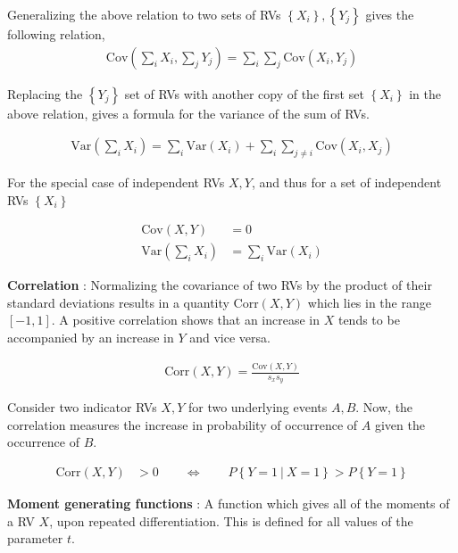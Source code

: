Generalizing the above relation to two sets of RVs $ \left\{X_i\right\}, \left\{Y_j\right\} $ gives the following relation, 
\begin{align}
	\mathrm{Cov} \left( \sum\limits_{i}X_i , \sum\limits_{j}Y_j \right) = \sum\limits_{i} \sum\limits_{j} \mathrm{Cov} (X_i, Y_j)
\end{align}

Replacing the $ \left\{Y_j\right\} $ set of RVs with another copy of the first set $  \left\{X_i\right\} $ in the above relation, gives a formula for the variance of the sum of RVs.

\begin{align}
	\mathrm{Var} \left( \sum\limits_{i}X_i \right) = \sum\limits_{i} \mathrm{Var}(X_i) + \sum\limits_{i} \sum\limits_{j \neq i} \mathrm{Cov} (X_i, X_j)
\end{align}

For the special case of independent RVs $ X, Y $, and thus for a set of independent RVs $ \left\{X_i\right\} $

\begin{align}
	\mathrm{Cov}(X, Y) &= 0 \\
	\mathrm{Var} \left( \sum\limits_{i}X_i \right) &= \sum\limits_{i}\mathrm{Var}(X_i) 
\end{align}

\textbf{Correlation} : Normalizing the covariance of two RVs by the product of their standard deviations results in a quantity $ \mathrm{Corr}(X, Y) $ which lies in the range $ \left[-1, 1\right] $. A positive correlation shows that an increase in $ X $ tends to be accompanied by an increase in $ Y $ and vice versa.

\begin{align}
	\mathrm{Corr}(X, Y) = \frac{\mathrm{Cov}(X, Y)}{s_x s_y}
\end{align}

Consider two indicator RVs $ X, Y $ for two underlying events $ A, B $. Now, the correlation measures the increase in probability of occurrence of $ A $ given the occurrence of $ B $. 

\begin{align}
	\mathrm{Corr}(X, Y) &> 0  \qquad \Leftrightarrow \qquad P \left\{ Y = 1\ |\ X = 1 \right\} > P \left\{ Y = 1 \right\}
\end{align}

\textbf{Moment generating functions} : A function which gives all of the moments of a RV $ X $, upon repeated differentiation. This is defined for all values of the parameter $ t $.

